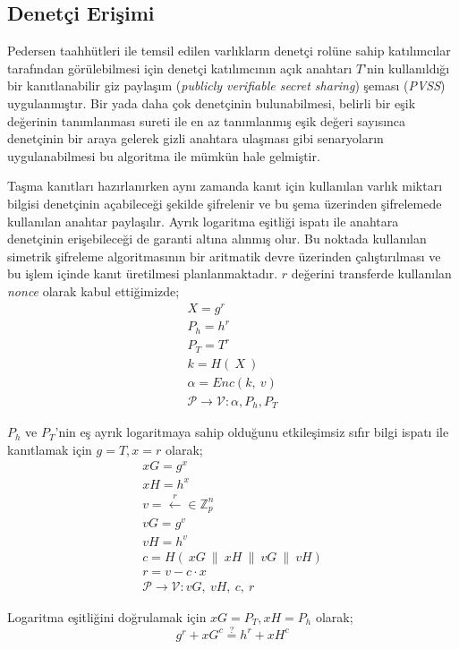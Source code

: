 \documentclass[a4paper,11pt]{article}
\begin{document}
\subsection{Denetçi Erişimi}
Pedersen taahhütleri ile temsil edilen varlıkların denetçi rolüne sahip katılımcılar tarafından görülebilmesi için denetçi katılımcının açık anahtarı $T$'nin kullanıldığı bir kanıtlanabilir giz paylaşım (\emph{publicly verifiable secret sharing}) şeması (\emph{PVSS\cite{pvss}}) uygulanmıştır. Bir yada daha çok denetçinin bulunabilmesi, belirli bir eşik değerinin tanımlanması sureti ile en az tanımlanmış eşik değeri sayısınca denetçinin bir araya gelerek gizli anahtara ulaşması gibi senaryoların uygulanabilmesi bu algoritma ile mümkün hale gelmiştir.

Taşma kanıtları hazırlanırken aynı zamanda kanıt için kullanılan varlık miktarı bilgisi denetçinin açabileceği şekilde şifrelenir ve bu şema üzerinden şifrelemede kullanılan anahtar paylaşılır. Ayrık logaritma eşitliği ispatı ile anahtara denetçinin erişebileceği de garanti altına alınmış olur. Bu noktada kullanılan simetrik şifreleme algoritmasının bir aritmatik devre üzerinden çalıştırılması ve bu işlem içinde kanıt üretilmesi planlanmaktadır. $r$ değerini transferde kullanılan \emph{nonce} olarak kabul ettiğimizde;
$$
\begin{array}{l}
X=g^{r}\\
P_{h} =h^{r}\\
P_{T} =T^{r}\\
k=H( \ X\ )\\
\alpha =Enc( k,\ v)\\
\mathcal{P}\rightarrow \mathcal{V} :\alpha ,P_{h} ,P_{T}
\end{array}
$$

$P_{h}$ ve $P_{T}$'nin eş ayrık logaritmaya sahip olduğunu etkileşimsiz sıfır bilgi ispatı ile kanıtlamak için $g=T, x=r$ olarak;
$$
\begin{array}{l}
xG=g^{x}\\
xH=h^{x}\\
v=\xleftarrow{r} \in \mathbb{Z}^{n}_{p}\\
vG=g^{v}\\
vH=h^{v}\\
c=H( \ xG\ \| \ xH\ \| \ vG\ \| \ vH)\\
r=v-c\cdotp x\\
\mathcal{P}\rightarrow \mathcal{V} :vG,\ vH,\ c,\ r
\end{array}
$$

Logaritma eşitliğini doğrulamak için $xG=P_{T}, xH=P_{h}$ olarak;
$$g^{r} +xG^{c}\stackrel{?}{=} h^{r} +xH^{c}$$
\end{document}
